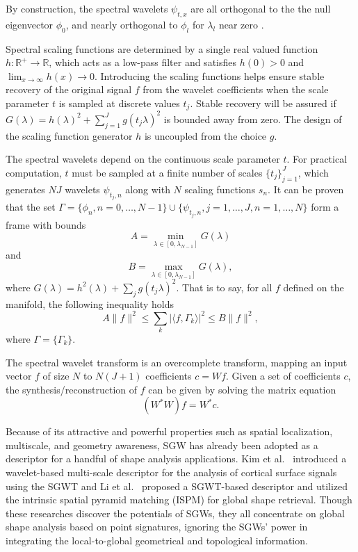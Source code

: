 By construction, the spectral wavelets $\psi_{t,x}$ are all orthogonal to the the null eigenvector $\phi_0$,
and nearly orthogonal to $\phi_l$ for $\lambda_l$ near zero \cite{Hammond2011}.

Spectral scaling functions are determined by a single real valued function $h:\mathbb{R}^+\to\mathbb{R}$,
which acts as a low-pass filter and satisfies $h(0)>0$ and $\lim_{x\to\infty}h(x)\to 0$.
Introducing the scaling functions helps ensure stable recovery of the original signal $f$ from the wavelet
coefficients when the scale parameter $t$ is sampled at discrete values ${t_j}$.
Stable recovery will be assured if $G(\lambda)=h(\lambda)^2+\sum_{j=1}^J g(t_j\lambda)^2$ is
bounded away from zero. The design of the scaling function generator $h$ is uncoupled from the choice $g$.

The spectral wavelets depend on the continuous scale parameter $t$. For practical computation,
$t$ must be sampled at a finite number of scales $\{t_j\}_{j=1}^J$, which generates
$NJ$ wavelets $\psi_{t_j,n}$ along with $N$ scaling functions $s_n$. It can be proven~\cite{Hammond2011}
that the set $\Gamma=\{\phi_n,n=0,\ldots,N-1\}\cup\{\psi_{t_j,n},j=1,\ldots,J,n=1,\ldots,N\}$
form a frame with bounds
\begin{equation*}
A=\min_{\lambda\in[0,\lambda_{N-1}]}G(\lambda)
\end{equation*}
and
\begin{equation*}
B=\max_{\lambda\in[0,\lambda_{N-1}]}G(\lambda),
\end{equation*}
where $G(\lambda)=h^2(\lambda)+\sum_j g(t_j\lambda)^2$. That is to say, for all $f$ defined on the manifold, the following inequality holds
\begin{equation}
A\|f\|^2\leq\sum_k|\langle f,\Gamma_k\rangle|^2\leq B\|f\|^2,
\end{equation}
where $\Gamma=\{\Gamma_k\}$.

The spectral wavelet transform is an overcomplete transform, mapping
an input vector $f$ of size $N$ to $N(J+1)$ coefficients $c=Wf$.
Given a set of coefficients $c$, the synthesis/reconstruction of $f$ can be given by solving the matrix equation
\begin{equation}
(W^*W)f=W^*c.
\end{equation}

Because of its attractive and powerful properties such as spatial localization, 
multiscale, and geometry awareness, SGW has already been adopted as a descriptor 
for a handful of shape analysis applications. Kim et al.~\cite{Kim:2012,Kim:2014}
introduced a wavelet-based multi-scale descriptor for the analysis of
cortical surface signals using the SGWT and Li et al.~\cite{Li:2013}
proposed a SGWT-based descriptor and utilized the intrinsic spatial
pyramid matching (ISPM) for global shape retrieval. Though these
researches discover the potentials of SGWs, they all concentrate on
global shape analysis based on point signatures, ignoring the SGWs'
power in integrating the local-to-global geometrical and topological information.

